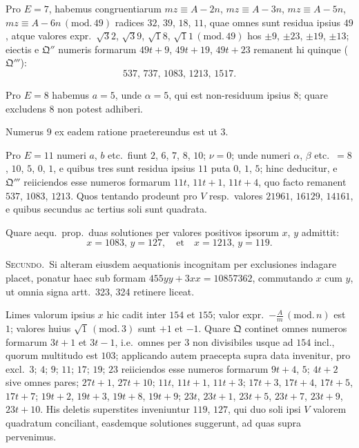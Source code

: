 \documentclass[12pt,a4paper]{article}
\theoremstyle{plain}
\theoremstyle{definition}
\theoremstyle{remark}
\newcommand{\Q}{\mathfrak{Q}}
\begin{document}
Pro $E=7$, habemus congruentiarum $mz\equiv A-2n$, $mz\equiv A-3n$, $mz\equiv A-5n$, $mz\equiv A-6n\,(\mathrm{mod.}\,49)$ radices $32$, $39$, $18$, $11$, quae omnes sunt residua ipsius $49$, atque valores expr.~$\surd 32$, $\surd 39$, $\surd 18$, $\surd 11\,(\mathrm{mod.}\,49)$ hos $\pm 9$, $\pm 23$, $\pm 19$, $\pm 13$; eiectis e $\Q''$ numeris formarum $49t+9$, $49t+19$, $49t+23$ remanent hi quinque ($\Q'''$):
\[537,\, 737,\, 1083,\, 1213,\, 1517.\]

Pro $E=8$ habemus $a=5$, unde $\alpha=5$, qui est non-residuum ipsius $8$; quare excludens $8$ non potest adhiberi.

Numerus $9$ ex eadem ratione praetereundus est ut $3$.

Pro $E=11$ numeri $a$, $b$ etc.\ fiunt $2$, $6$, $7$, $8$, $10$; $\nu=0$; unde numeri $\alpha$, $\beta$ etc.\ $=8$, $10$, $5$, $0$, $1$, e quibus tres sunt residua ipsius $11$ puta $0$, $1$, $5$; hinc deducitur, e $\Q'''$ reiiciendos esse numeros formarum $11t$, $11t+1$, $11t+4$, quo facto remanent $537$, $1083$, $1213$. Quos tentando prodeunt pro $V$ resp.\ valores $21961$, $16129$, $14161$, e quibus secundus ac tertius soli sunt quadrata.

Quare aequ.\ prop.\ duas solutiones per valores positivos ipsorum $x$, $y$ admittit:
\[x=1083,\, y=127,\quad\text{et}\quad x=1213,\, y=119.\]

\textsc{Secundo.}\ Si alteram eiusdem aequationis incognitam per exclusiones indagare placet, ponatur haec sub formam $455yy+3xx=10857362$, commutando $x$ cum $y$, ut omnia signa artt.\ 323, 324 retinere liceat.

Limes valorum ipsius $x$ hic cadit inter $154$ et $155$; valor expr.~$-\frac{A}{m}\,(\mathrm{mod.}\,n)$ est $1$; valores huius $\surd 1\,(\mathrm{mod.}\,3)$ sunt $+1$ et $-1$. Quare $\Q$ continet omnes numeros formarum $3t+1$ et $3t-1$, i.e.\ omnes per $3$ non divisibiles usque ad $154$ incl., quorum multitudo est $103$; applicando autem praecepta supra data invenitur, pro excl.\ $3$; $4$; $9$; $11$; $17$; $19$; $23$ reiiciendos esse numeros formarum $9t+4$, $5$; $4t+2$ sive omnes pares; $27t+1$, $27t+10$; $11t$, $11t+1$, $11t+3$; $17t+3$, $17t+4$, $17t+5$, $17t+7$; $19t+2$, $19t+3$, $19t+8$, $19t+9$; $23t$, $23t+1$, $23t+5$, $23t+7$, $23t+9$, $23t+10$. His deletis superstites inveniuntur $119$, $127$, qui duo soli ipsi $V$ valorem quadratum conciliant, easdemque solutiones suggerunt, ad quas supra pervenimus.

\section{}
\end{document}

